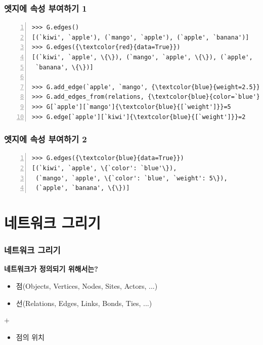 \documentclass{beamer}
\begin{document}
\begin{frame}[fragile]
\frametitle{엣지에 속성 부여하기 1}
\begin{block}{}
\begin{Verbatim}[numbers=left,commandchars=\\\{\}]
>>> G.edges()
[(`kiwi', `apple'), (`mango', `apple'), (`apple', `banana')]
>>> G.edges({\textcolor{red}{data=True}})
[(`kiwi', `apple', \{\}), (`mango', `apple', \{\}), (`apple',
 `banana', \{\})]
 
>>> G.add_edge(`apple', `mango', {\textcolor{blue}{weight=2.5}})
>>> G.add_edges_from(relations, {\textcolor{blue}{color=`blue'}})
>>> G[`apple'][`mango']{\textcolor{blue}{[`weight']}}=5
>>> G.edge[`apple'][`kiwi']{\textcolor{blue}{[`weight']}}=2
\end{Verbatim}
\end{block}
\end{frame}

\begin{frame}[fragile]
\frametitle{엣지에 속성 부여하기 2}
\begin{block}{}
\begin{Verbatim}[numbers=left,commandchars=\\\{\}]
>>> G.edges({\textcolor{blue}{data=True}})
[(`kiwi', `apple', \{`color': `blue'\}),
 (`mango', `apple', \{`color': `blue', `weight': 5\}),
 (`apple', `banana', \{\})]
\end{Verbatim}
\end{block}
\end{frame}


\section{네트워크 그리기}

\begin{frame}
\frametitle{네트워크 그리기}
\textbf{네트워크가 정의되기 위해서는?}
\begin{itemize}
\item 점(Objects, Vertices, Nodes, Sites, Actors, ...)
\item 선(Relations, Edges, Links, Bonds, Ties, ...)
\end{itemize}
{\hspace{8mm}\textbf{$+$}}
\begin{itemize}
\item 점의 위치
\end{itemize}
\end{frame}
\end{document}
